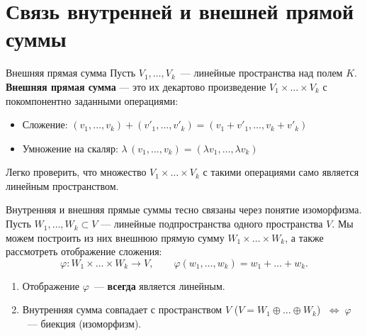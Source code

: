 
\section{Связь внутренней и внешней прямой суммы}

\begin{Definition}{Внешняя прямая сумма}{}
	Пусть $V_1, \ldots, V_k$~--- линейные пространства над полем $K$.
	\textbf{Внешняя прямая сумма} --- это их декартово произведение $V_1 \times \ldots \times V_k$ с покомпонентно заданными операциями:
	\begin{itemize}
		\item Сложение: $(v_1, \ldots, v_k) + (v'_1, \ldots, v'_k) = (v_1 + v'_1, \ldots, v_k + v'_k)$
		\item Умножение на скаляр: $\lambda\,(v_1, \ldots, v_k) = (\lambda v_1, \ldots, \lambda v_k)$
	\end{itemize}
	Легко проверить, что множество $V_1 \times \ldots \times V_k$ с такими операциями само является линейным пространством.
\end{Definition}

Внутренняя и внешняя прямые суммы тесно связаны через понятие изоморфизма. Пусть $W_1, \ldots, W_k \subset V$ --- линейные подпространства одного пространства $V$. Мы можем построить из них внешнюю прямую сумму $W_1 \times \ldots \times W_k$, а также рассмотреть отображение сложения:
\[
\varphi \colon W_1 \times \ldots \times W_k \longrightarrow V,
\qquad
\varphi(w_1, \ldots, w_k) = w_1 + \ldots + w_k.
\]

\begin{Proposition}{}{}
	\begin{enumerate}
		\item Отображение $\varphi$~--- \textbf{всегда} является линейным.
		\item Внутренняя сумма совпадает с пространством $V$ ($V = W_1 \oplus \ldots \oplus W_k$) $\;\Longleftrightarrow\; \varphi$~--- биекция (изоморфизм).
	\end{enumerate}
\end{Proposition}

